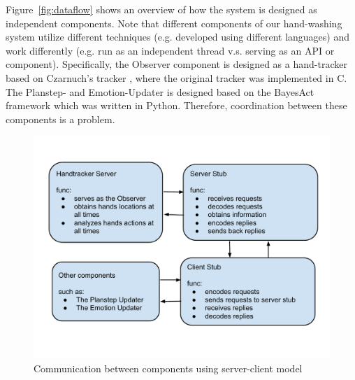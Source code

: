 Figure~\ref{fig:dataflow} shows an overview of how the system is designed as independent components. Note that different components of our hand-washing system utilize different techniques (e.g. developed using different languages) and work differently (e.g. run as an independent thread v.s. serving as an API or component). Specifically, the Observer component is designed as a hand-tracker based on Czarnuch's tracker \cite{czarnuch2014}, where the original tracker was implemented in C. The Planstep- and Emotion-Updater is designed based on the BayesAct framework \cite{hoey2013bayesian} which was written in Python. Therefore, coordination between these components is a problem. 


\begin{figure}[htp]
\centering
\includegraphics[trim = 6mm 22mm 6mm 18mm, clip, width=0.9\linewidth]{fig/fig-communication.pdf}
\caption{Communication between components using server-client model}
\label{fig:communication}
\end{figure}

